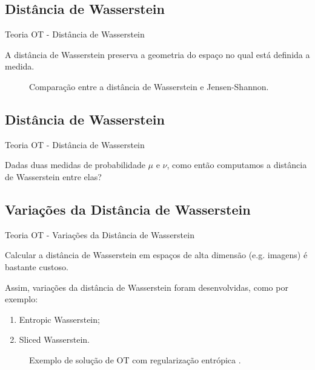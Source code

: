 \documentclass[10pt]{beamer}
\begin{document}
\subsection{Distância de Wasserstein}
\begin{frame}[fragile]{Teoria OT - Distância de Wasserstein}

	A distância de Wasserstein preserva a geometria do espaço
	no qual está definida a medida.

	\begin{figure}[H]
		\centering
		\def\svgscale{0.45}
		
		\caption{Comparação entre a distância de Wasserstein e Jensen-Shannon.}
		\label{fig:pub}
	\end{figure}

\end{frame}

\subsection{Distância de Wasserstein}
\begin{frame}[fragile]{Teoria OT - Distância de Wasserstein}

	Dadas duas medidas de probabilidade $\mu$ e $\nu$,
	como então computamos a distância de Wasserstein
	entre elas?

\end{frame}

\subsection{Variações da Distância de Wasserstein}
\begin{frame}[fragile]{Teoria OT - Variações da Distância de Wasserstein}

	Calcular a distância de Wasserstein em espaços de alta dimensão (e.g. imagens)
	é bastante custoso.

	\vspace{3mm}
	Assim, variações da distância
	de Wasserstein foram desenvolvidas, como por exemplo:
	\begin{enumerate}
		\item Entropic Wasserstein;
		\item Sliced Wasserstein.
	\end{enumerate}

	\begin{figure}[H]
		\centering
		\def\svgscale{0.4}
		
		\caption{
			Exemplo de solução de OT com regularização entrópica
			\citep{sales2021optimal}.}
		\label{fig:pub}
	\end{figure}

\end{frame}
\end{document}
